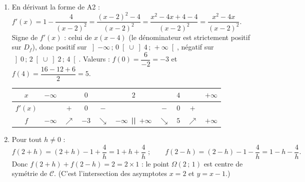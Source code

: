 \documentclass[11pt]{article}
\newcommand{\cle}[1]{{\popxbold\color{popdark}#1}}
\begin{document}
\begin{corrige}
\begin{enumerate}
\begin{itemize}
\item si $x<2$ : $\mathscr{C}$ est strictement \textbf{en dessous} de $\Delta$.
\end{itemize}
\item En dérivant la forme de A2 : $f'(x)=1-\dfrac{4}{(x-2)^2}=\dfrac{(x-2)^2-4}{(x-2)^2}=\dfrac{x^2-4x+4-4}{(x-2)^2}=\dfrac{x^2-4x}{(x-2)^2}$.
Signe de $f'(x)$ : celui de $x(x-4)$ (le dénominateur est strictement positif sur $D_f$), donc positif sur $\left]-\infty\,;\,0\right[\cup\left]4\,;\,+\infty\right[$, négatif sur $\left]0\,;\,2\right[\cup\left]2\,;\,4\right[$.
Valeurs : $f(0)=\dfrac{6}{-2}=-3$ et $f(4)=\dfrac{16-12+6}{2}=5$.
\begin{center}
\begin{tabular}{|c|ccccccccc|}\hline
$x$ & $-\infty$ & & $0$ & & $2$ & & $4$ & & $+\infty$ \\ \hline
$f'(x)$ & & $+$ & $0$ & $-$ & & $-$ & $0$ & $+$ & \\ \hline
$f$ & $-\infty$ & $\nearrow$ & $-3$ & $\searrow$ & $-\infty$\ \textbf{||}\ $+\infty$ & $\searrow$ & $5$ & $\nearrow$ & $+\infty$ \\ \hline
\end{tabular}
\end{center}
\item Pour tout $h\neq 0$ :
\[ f(2+h)=(2+h)-1+\frac{4}{h}=1+h+\frac{4}{h}\;;\qquad f(2-h)=(2-h)-1-\frac{4}{h}=1-h-\frac{4}{h}. \]
Donc $f(2+h)+f(2-h)=2=2\times 1$ : le point $\boxed{\Omega(2\,;\,1)}$ est \cle{centre de symétrie} de $\mathscr{C}$. (C'est l'intersection des asymptotes $x=2$ et $y=x-1$.)
\end{enumerate}


\end{corrige}
\end{document}
